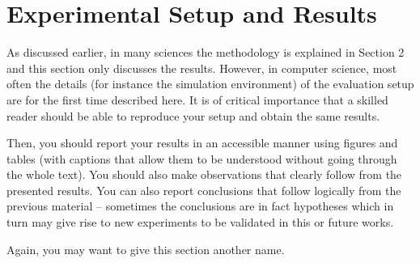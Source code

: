 \section{Experimental Setup and Results}
As discussed earlier, in many sciences the methodology is explained in Section 2 and this section only discusses the results. 
However, in computer science, most often the details (for instance the simulation environment) of the evaluation setup are for the first time described here. It is of critical importance that a skilled reader should be able to reproduce your setup and obtain the same results.

Then, you should report your results in an accessible manner using figures and tables (with captions that allow them to be understood without going through the whole text). You should also make observations that clearly follow from the presented results. You can also report conclusions that follow logically from the previous material -- sometimes the conclusions are in fact hypotheses which in turn may give rise to new experiments to be validated in this or future works.

Again, you may want to give this section another name.